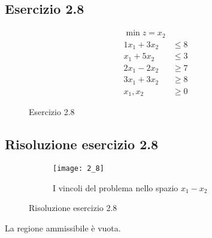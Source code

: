 \documentclass[\main/main.tex]{subfiles}
\begin{document}
\subsection{Esercizio 2.8}

\begin{figure}
  \begin{align*}
    \min z = x_2         \\
    1x_1 + 3x_2 & \leq 8 \\
    x_1 + 5x_2  & \leq 3 \\
    2x_1 - 2x_2 & \geq 7 \\
    3x_1 + 3x_2 & \geq 8 \\
    x_1, x_2    & \geq 0
  \end{align*}
  \caption{Esercizio 2.8}
\end{figure}

\subsection{Risoluzione esercizio 2.8}

\begin{figure}
  \begin{subfigure}{0.45\textwidth}
    \texttt{[image: 2\_8]}
    \caption{I vincoli del problema nello spazio $x_1 - x_2$}
  \end{subfigure}
  \caption{Risoluzione esercizio 2.8}
\end{figure}

La regione ammissibile è vuota.
\end{document}
